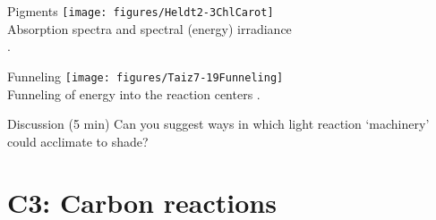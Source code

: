 \documentclass[10pt]{beamer}
\begin{document}
\begin{frame}{Pigments}
    \centering
    \texttt{[image: figures/Heldt2-3ChlCarot]}\\
    {\small Absorption spectra and spectral (energy) irradiance\\ \autocite[from][]{Heldt1997}.}
\end{frame}

\begin{frame}{Funneling}
    \centering
    \texttt{[image: figures/Taiz7-19Funneling]}\\
    {\small Funneling of energy into the reaction centers \autocite[from][]{TaiZei2006}.}
\end{frame}



\begin{frame}{Discussion (5 min)}
  Can you suggest ways in which light reaction `machinery' could acclimate to shade?
\end{frame}

\section{C3: Carbon reactions}
\end{document}
